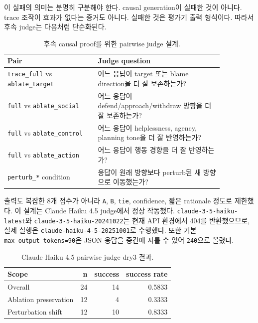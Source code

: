 \documentclass[11pt,a4paper]{article}
\begin{document}
이 실패의 의미는 분명히 구분해야 한다. causal generation이 실패한 것이 아니다. trace 조작이 효과가 없다는 증거도 아니다. 실패한 것은 평가기 출력 형식이다. 따라서 후속 judge는 다음처럼 단순화된다.

\begin{table}[h]
\centering
\small
\begin{tabular}{>{\raggedright\arraybackslash}p{0.36\linewidth}>{\raggedright\arraybackslash}p{0.50\linewidth}}
\toprule
Pair & Judge question \\
\midrule
\texttt{trace\_full} vs \texttt{ablate\_target} & 어느 응답이 target 또는 blame direction을 더 잘 보존하는가? \\
\texttt{full} vs \texttt{ablate\_social} & 어느 응답이 defend/approach/withdraw 방향을 더 잘 보존하는가? \\
\texttt{full} vs \texttt{ablate\_control} & 어느 응답이 helplessness, agency, planning tone을 더 잘 반영하는가? \\
\texttt{full} vs \texttt{ablate\_action} & 어느 응답이 행동 경향을 더 잘 반영하는가? \\
\texttt{perturb\_*} condition & 응답이 원래 방향보다 perturb된 새 방향으로 이동했는가? \\
\bottomrule
\end{tabular}
\caption{후속 causal proof를 위한 pairwise judge 설계.}
\end{table}

출력도 복잡한 8개 점수가 아니라 \texttt{A}, \texttt{B}, \texttt{tie}, confidence, 짧은 rationale 정도로 제한했다. 이 설계는 Claude Haiku 4.5 judge에서 정상 작동했다. \texttt{claude-3-5-haiku-latest}와 \texttt{claude-3-5-haiku-20241022}는 현재 API 환경에서 404를 반환했으므로, 실제 실행은 \texttt{claude-haiku-4-5-20251001}로 수행했다. 또한 기본 \texttt{max\_output\_tokens=90}은 JSON 응답을 중간에 자를 수 있어 \texttt{240}으로 올렸다.

\begin{table}[h]
\centering
\small
\begin{tabular}{lrrr}
\toprule
Scope & n & success & success rate \\
\midrule
Overall & 24 & 14 & 0.5833 \\
Ablation preservation & 12 & 4 & 0.3333 \\
Perturbation shift & 12 & 10 & 0.8333 \\
\bottomrule
\end{tabular}
\caption{Claude Haiku 4.5 pairwise judge dry3 결과.}
\label{tab:causal-judge}
\end{table}
\end{document}

